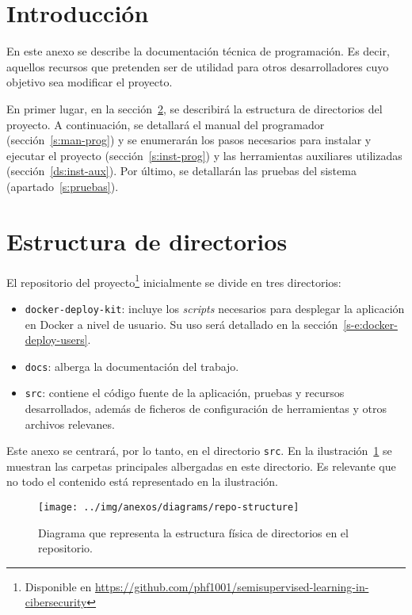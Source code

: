 
\section{Introducción}

En este anexo se describe la documentación técnica de programación. Es decir, aquellos recursos que pretenden ser de utilidad para otros desarrolladores cuyo objetivo sea modificar el proyecto.

En primer lugar, en la sección~\ref{s:estructura-dirs}, se describirá la estructura de directorios del proyecto. A continuación, se detallará el manual del programador (sección~\ref{s:man-prog}) y se enumerarán los pasos necesarios para instalar y ejecutar el proyecto (sección~\ref{s:inst-prog}) y las herramientas auxiliares utilizadas (sección~\ref{ds:inst-aux}). Por último, se detallarán las pruebas del sistema (apartado~\ref{s:pruebas}).

\section{Estructura de directorios}
\label{s:estructura-dirs}

El repositorio del proyecto\footnote{Disponible en \url{https://github.com/phf1001/semisupervised-learning-in-cibersecurity}} inicialmente se divide en tres directorios:

\begin{itemize}
	\item \texttt{docker-deploy-kit}: incluye los \textit{scripts} necesarios para desplegar la aplicación en Docker a nivel de usuario. Su uso será detallado en la sección~\ref{s-e:docker-deploy-users}.
	\item \texttt{docs}: alberga la documentación del trabajo.
	\item \texttt{src}: contiene el código fuente de la aplicación, pruebas y recursos desarrollados, además de ficheros de configuración de herramientas y otros archivos relevanes.
\end{itemize}

Este anexo se centrará, por lo tanto, en el directorio \texttt{src}. En la ilustración~\ref{d:diag-repo-structure} se muestran las carpetas principales albergadas en este directorio. Es relevante que no todo el contenido está representado en la ilustración.

\begin{figure}[h]
	\caption[Diagrama: estructura de directorios]{Diagrama que representa la estructura física de directorios en el repositorio.}
	\centering
	\texttt{[image: ../img/anexos/diagrams/repo-structure]}
	\label{d:diag-repo-structure}
\end{figure}

